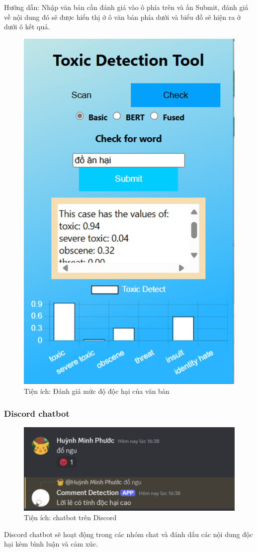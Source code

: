 Hướng dẫn: Nhập văn bản cần đánh giá vào ô phía trên và ấn Submit, đánh giá về nội dung đó sẽ được hiển thị ở ô văn bản phía dưới và biểu đồ sẽ hiện ra ở dưới ô kết quả.

\begin{figure}[htb]
    \centering
    \includegraphics[width=\textwidth]{image/ex_text_eval.png}
    \caption{Tiện ích: Đánh giá mức độ độc hại của văn bản}
    \label{figure:ex_text_eval}
\end{figure}

\subsubsection{Discord chatbot}

\begin{figure}[htb]
    \centering
    \includegraphics[width=\textwidth]{image/bot_discord.png}
    \caption{Tiện ích: chatbot trên Discord}
    \label{figure:bot_discord}
\end{figure}

Discord chatbot sẽ hoạt động trong các nhóm chat và đánh dấu các nội dung độc hại kèm bình luận và cảm xúc.